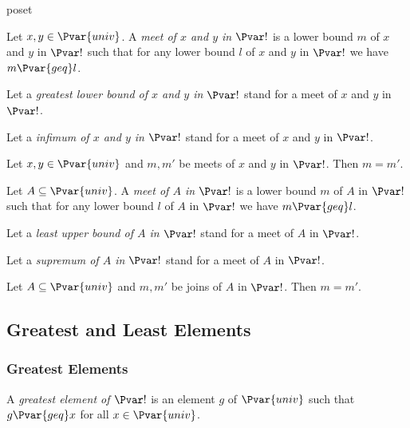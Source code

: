 \documentclass{stex}
\begin{document}
\begin{smodule}{poset}
  \begin{forthel}
    \begin{definition*}
      Let $x, y \in \Pvar{univ}$.
      A \emph{meet of $x$ and $y$ in $\Pvar!$} is a lower bound $m$ of $x$ and $y$ in $\Pvar!$ such that for any lower bound $l$ of $x$ and $y$ in $\Pvar!$ we have $m {\Pvar{geq}} l$.
    \end{definition*}

    Let a \emph{greatest lower bound of $x$ and $y$ in $\Pvar!$} stand for a meet of $x$ and $y$ in $\Pvar!$.

    Let a \emph{infimum of $x$ and $y$ in $\Pvar!$} stand for a meet of $x$ and $y$ in $\Pvar!$.

    \begin{proposition*}
      Let $x, y \in \Pvar{univ}$ and $m, m'$ be meets of $x$ and $y$ in $\Pvar!$.
      Then $m = m'$.
    \end{proposition*}
    
    \begin{definition*}
      Let $A \subseteq \Pvar{univ}$.
      A \emph{meet of $A$ in $\Pvar!$} is a lower bound $m$ of $A$ in $\Pvar!$ such that for any lower bound $l$ of $A$ in $\Pvar!$ we have $m {\Pvar{geq}} l$.
    \end{definition*}

    Let a \emph{least upper bound of $A$ in $\Pvar!$} stand for a meet of $A$ in $\Pvar!$.

    Let a \emph{supremum of $A$ in $\Pvar!$} stand for a meet of $A$ in $\Pvar!$.

    \begin{proposition*}
      Let $A \subseteq \Pvar{univ}$ and $m, m'$ be joins of $A$ in $\Pvar!$.
      Then $m = m'$.
    \end{proposition*}
  \end{forthel}

  \subsection{Greatest and Least Elements}

  \subsubsection{Greatest Elements}

  \begin{forthel}
    \begin{definition*}
      A \emph{greatest element of $\Pvar!$} is an element $g$ of $\Pvar{univ}$ such that $g {\Pvar{geq}} x$ for all $x \in \Pvar{univ}$.
    \end{definition*}


\end{forthel}
\end{smodule}
\end{document}
